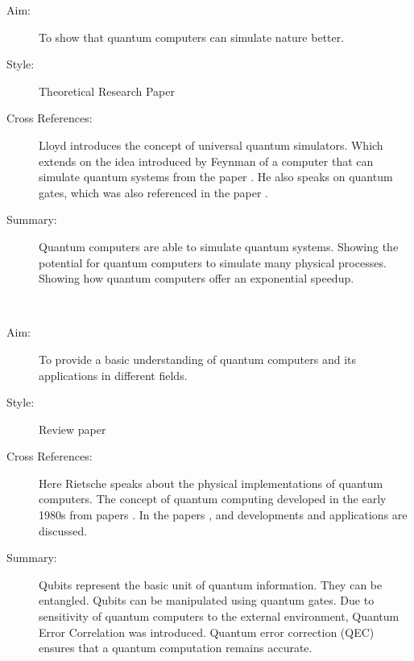 \documentclass{Assignment}
\begin{document}
\begin{description}
	\item[Aim:] 
	To show that quantum computers can simulate nature better.
	
	\item [Style:] Theoretical Research Paper
	
	\item [Cross References:]
	Lloyd introduces the concept of universal quantum simulators. 
	Which extends on the idea introduced by Feynman of a computer that can simulate quantum systems from the paper \cite{feynman1982simulating}. 
	He also speaks on quantum gates, which was also referenced in the paper \cite{Deutsch1989}.
	
	\item[Summary:] 
	Quantum computers are able to simulate quantum systems. 
	Showing the potential for quantum computers to simulate many physical processes.	
	Showing how quantum computers offer an exponential speedup.

	
	
\end{description}
\newpage
\cite{rietsche2022quantum}~
\begin{description}
	\item[Aim:] 
	To provide a basic understanding of quantum computers and its applications in different fields.
	
	\item [Style:] 
	Review paper
	
	\item [Cross References:] 
	Here Rietsche speaks about the physical implementations of quantum computers. 
	The concept of quantum computing developed in the early 1980s from papers \cite{feynman1982simulating}. 	
	In the papers \cite{PhysRevA.93.032301}, \cite{doi:10.1137/S0097539796298637} and \cite{UQS} developments and applications are discussed.
	\item[Summary:] 
	Qubits represent the basic unit of quantum information.
	They can be entangled.
	Qubits can be manipulated using quantum gates.
	Due to sensitivity of quantum computers to the external environment, Quantum Error Correlation was introduced.
	Quantum error correction (QEC) ensures that a quantum computation remains  accurate.
\end{description}
	 	\newpage
	 	
\end{document}
